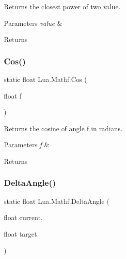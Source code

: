 Returns the closest power of two value. 


\begin{DoxyParams}{Parameters}
{\em value} & \\
\hline
\end{DoxyParams}
\begin{DoxyReturn}{Returns}

\end{DoxyReturn}
\mbox{\label{class_lua_1_1_mathf_a9bb7f6cc54371f64edaf224c4a5365b6}} 
\subsubsection{\texorpdfstring{Cos()}{Cos()}}
{\footnotesize\ttfamily static float Lua.\+Mathf.\+Cos (\begin{DoxyParamCaption}\item[{float}]{f }\end{DoxyParamCaption})\hspace{0.3cm}{\ttfamily [static]}}



Returns the cosine of angle f in radians. 


\begin{DoxyParams}{Parameters}
{\em f} & \\
\hline
\end{DoxyParams}
\begin{DoxyReturn}{Returns}

\end{DoxyReturn}
\mbox{\label{class_lua_1_1_mathf_aad5844ff29ce4955f86e72b701cf871b}} 
\subsubsection{\texorpdfstring{DeltaAngle()}{DeltaAngle()}}
{\footnotesize\ttfamily static float Lua.\+Mathf.\+Delta\+Angle (\begin{DoxyParamCaption}\item[{float}]{current,  }\item[{float}]{target }\end{DoxyParamCaption})\hspace{0.3cm}{\ttfamily [static]}}



